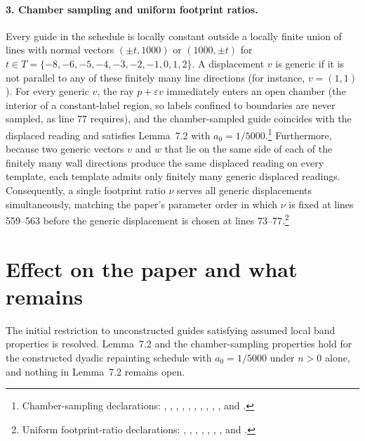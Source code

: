 \documentclass{article}
\begin{document}
\paragraph{3. Chamber sampling and uniform footprint ratios.}
Every guide in the schedule is locally constant outside a locally finite union
of lines with normal vectors $(\pm t,1000)$ or $(1000,\pm t)$ for
$t\in T=\{-8,-6,-5,-4,-3,-2,-1,0,1,2\}$. A displacement $v$ is generic if it is
not parallel to any of these finitely many line directions (for instance,
$v=(1,1)$). For every generic $v$, the ray $p+\varepsilon v$ immediately enters
an open chamber (the interior of a constant-label region, so labels confined to
boundaries are never sampled, as line 77 requires), and the chamber-sampled
guide coincides with the displaced reading and satisfies Lemma~7.2 with
$a_0=1/5000$.\footnote{Chamber-sampling declarations:
,
,
,
,
,
,
,
,
,
, and
.}
Furthermore, because two generic vectors $v$ and $w$ that lie on the same side
of each of the finitely many wall directions produce the same displaced reading
on every template, each template admits only finitely many generic displaced
readings. Consequently, a single footprint ratio $\nu$ serves all generic
displacements simultaneously, matching the paper's parameter order in which
$\nu$ is fixed at lines 559--563 before the generic displacement is chosen at
lines 73--77.\footnote{Uniform footprint-ratio declarations:
,
,
,
,
,
,
, and
.}

\section{Effect on the paper and what remains}

The initial restriction to unconstructed guides satisfying assumed local band
properties is resolved. Lemma~7.2 and the chamber-sampling properties hold for
the constructed dyadic repainting schedule with $a_0=1/5000$ under $n>0$ alone,
and nothing in Lemma~7.2 remains open.
\end{document}
